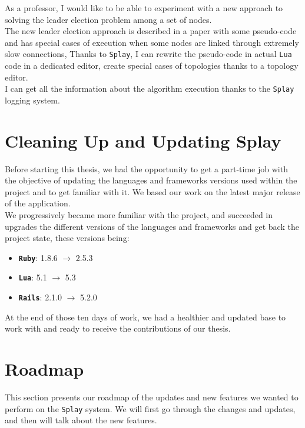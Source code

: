 \documentclass{eplmastersthesis}
\begin{document}
        As a professor, I would like to be able to experiment with a new
        approach to solving the leader election problem among a set of
        nodes.\\
        The new leader election approach is described in a paper with some
        pseudo-code and has special cases of execution when some nodes
        are linked through extremely slow connections,
        Thanks to \texttt{Splay}, I can rewrite the pseudo-code in actual
        \texttt{Lua} code in a dedicated editor, create special cases of topologies
        thanks to a topology editor.\\
        I can get all the information about the algorithm execution
        thanks to the \texttt{Splay} logging system.

    \section{Cleaning Up and Updating Splay}

      Before starting this thesis, we had the opportunity to get a part-time
      job with the objective of updating the languages and frameworks versions
      used within the project and to get familiar with it. We based our work on
      the latest major release of the application.\\

      We progressively became more familiar with the project, and succeeded
      in upgrades the different versions of the languages and frameworks and
      get back the project state, these versions being:

      \begin{itemize}
        \item \textbf{\texttt{Ruby}}: 1.8.6 $\rightarrow$ 2.5.3
        \item \textbf{\texttt{Lua}}: 5.1 $\rightarrow$ 5.3
        \item \textbf{\texttt{Rails}}: 2.1.0 $\rightarrow$ 5.2.0
      \end{itemize}

      At the end of those ten days of work, we had a healthier and updated
      base to work with and ready to receive the contributions of our thesis.

    \section{Roadmap}

      This section presents our roadmap of the updates and new features
      we wanted to perform on the \texttt{Splay} system. We will first go through
      the changes and updates, and then will talk about the new features.
\end{document}
